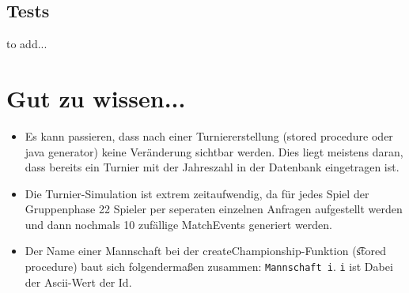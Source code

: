 \documentclass[11pt,german]{scrartcl}
\begin{document}
\subsection*{Tests}
to add...

\section*{Gut zu wissen...}
\begin{itemize}
\item Es kann passieren, dass nach einer Turniererstellung (stored procedure oder java generator) keine Veränderung sichtbar werden.
Dies liegt meistens daran, dass bereits ein Turnier mit der Jahreszahl in der Datenbank eingetragen ist.

\item Die Turnier-Simulation ist extrem zeitaufwendig, da für jedes Spiel der Gruppenphase 22 Spieler per seperaten einzelnen Anfragen aufgestellt werden und dann nochmals 10 zufällige MatchEvents generiert werden.

\item Der Name einer Mannschaft bei der createChampionship-Funktion (\t stored procedure) baut sich folgendermaßen zusammen: {\tt Mannschaft i}. \texttt{i} ist Dabei der Ascii-Wert der Id.

\end{itemize}
\end{document}
